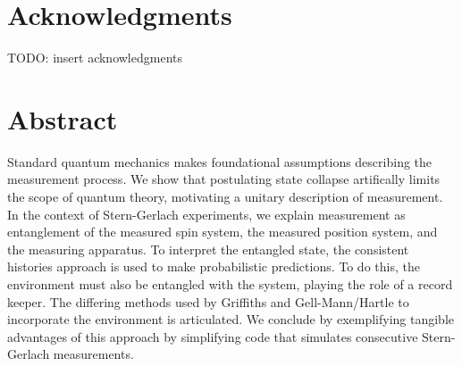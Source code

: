 
\chapter*{Acknowledgments}

TODO: insert acknowledgments

\clearpage


\chapter*{Abstract}

Standard quantum mechanics makes foundational assumptions describing the measurement process. We show that postulating state collapse artifically limits the scope of quantum theory, motivating a unitary description of measurement. In the context of Stern-Gerlach experiments, we explain measurement as entanglement of the measured spin system, the measured position system, and the measuring apparatus. To interpret the entangled state, the consistent histories approach is used to make probabilistic predictions. To do this, the environment must also be entangled with the system, playing the role of a record keeper. The differing methods used by Griffiths and Gell-Mann/Hartle to incorporate the environment is articulated. We conclude by exemplifying tangible advantages of this approach by simplifying code that simulates consecutive Stern-Gerlach measurements.


\clearpage


\tableofcontents

\listoffigures

\clearpage


